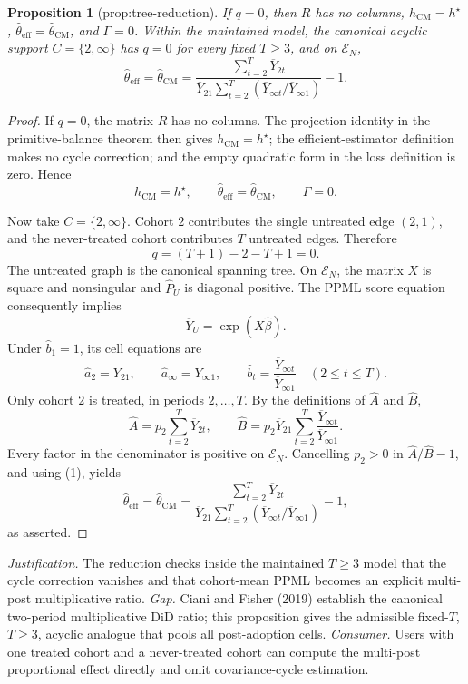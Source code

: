 \documentclass{article}
\newtheorem{proposition}{Proposition}
\begin{document}
\begin{proposition}[prop:tree-reduction]\label{prop:tree-reduction}
If \(q=0\), then \(R\) has no columns, \(h_{\mathrm{CM}}=h^{\star}\), \(\widehat\theta_{\mathrm{eff}}=\widehat\theta_{\mathrm{CM}}\), and \(\Gamma=0\). Within the maintained model, the canonical acyclic support \(C=\{2,\infty\}\) has \(q=0\) for every fixed \(T\ge3\), and on \(\mathcal E_N\), \[\widehat\theta_{\mathrm{eff}}=\widehat\theta_{\mathrm{CM}}=\frac{\sum_{t=2}^T\overline Y_{2t}}{\overline Y_{21}\sum_{t=2}^T(\overline Y_{\infty t}/\overline Y_{\infty1})}-1.\]
\end{proposition}
\begin{proof}
If \(q=0\), the matrix \(R\) has no columns.  The projection identity in the primitive-balance theorem then gives
\(h_{\mathrm{CM}}=h^{\star}\); the efficient-estimator definition makes no cycle correction; and the empty quadratic form in the loss definition is zero.  Hence
\[
h_{\mathrm{CM}}=h^{\star},
\qquad
\widehat\theta_{\mathrm{eff}}=\widehat\theta_{\mathrm{CM}},
\qquad
\Gamma=0.                                                              \tag{1}
\]

Now take \(C=\{2,\infty\}\).  Cohort \(2\) contributes the single untreated edge \((2,1)\), and the never-treated cohort contributes \(T\) untreated edges.  Therefore
\[
q=(T+1)-2-T+1=0.                                                        \tag{2}
\]
The untreated graph is the canonical spanning tree.  On \(\mathcal E_N\), the matrix \(X\) is square and nonsingular and \(\widehat P_U\) is diagonal positive.  The PPML score equation consequently implies
\[
\overline Y_U=\exp(X\widehat\beta).                                   \tag{3}
\]
Under \(\widehat b_1=1\), its cell equations are
\[
\widehat a_2=\overline Y_{21},
\qquad
\widehat a_\infty=\overline Y_{\infty1},
\qquad
\widehat b_t=\frac{\overline Y_{\infty t}}{\overline Y_{\infty1}}
\quad(2\le t\le T).                                                     \tag{4}
\]
Only cohort \(2\) is treated, in periods \(2,\ldots,T\).  By the definitions of \(\widehat A\) and \(\widehat B\),
\[
\widehat A=p_2\sum_{t=2}^T\overline Y_{2t},
\qquad
\widehat B=p_2\overline Y_{21}
\sum_{t=2}^T\frac{\overline Y_{\infty t}}{\overline Y_{\infty1}}.    \tag{5}
\]
Every factor in the denominator is positive on \(\mathcal E_N\).  Cancelling \(p_2>0\) in \(\widehat A/\widehat B-1\), and using (1), yields
\[
\widehat\theta_{\mathrm{eff}}
=\widehat\theta_{\mathrm{CM}}
=\frac{\sum_{t=2}^T\overline Y_{2t}}
{\overline Y_{21}\sum_{t=2}^T
 (\overline Y_{\infty t}/\overline Y_{\infty1})}-1,
\]
as asserted.
\end{proof}
\par\smallskip\noindent \textit{Justification.} The reduction checks inside the maintained \(T\ge3\) model that the cycle correction vanishes and that cohort-mean PPML becomes an explicit multi-post multiplicative ratio. \textit{Gap.} Ciani and Fisher (2019) establish the canonical two-period multiplicative DiD ratio; this proposition gives the admissible fixed-\(T\), \(T\ge3\), acyclic analogue that pools all post-adoption cells. \textit{Consumer.} Users with one treated cohort and a never-treated cohort can compute the multi-post proportional effect directly and omit covariance-cycle estimation.
\end{document}
